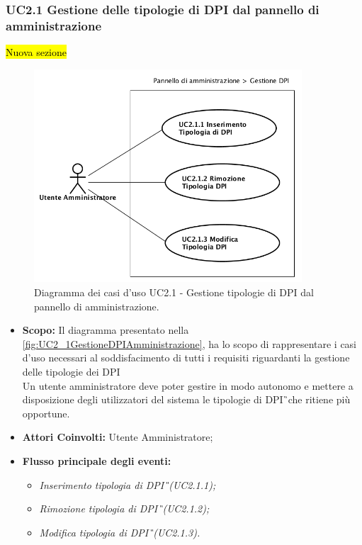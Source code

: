 		\subsubsection{UC2.1 Gestione delle tipologie di DPI dal pannello di amministrazione }
			\label{section:UC2_1}
			\hl{Nuova sezione}
			\begin{figure}[H]
				\begin{center}
					\includegraphics[width=10cm]{Pics/UC2_1GestioneDispositiviDiProtezioneIndividualeDaPannelloDiAmministrazione.png}
					\caption{
						Diagramma dei casi d'uso UC2.1 - Gestione tipologie di DPI dal pannello di amministrazione.}
					\label{fig:UC2_1GestioneDPIAmministrazione}
				\end{center}
			\end{figure}
			\begin{itemize}
				\item \textbf{Scopo:} Il diagramma presentato nella \autoref{fig:UC2_1GestioneDPIAmministrazione}, ha lo scopo di rappresentare i casi d'uso necessari al soddisfacimento di tutti i requisiti riguardanti la gestione delle tipologie dei \gls{DPI}\G\. \\ Un utente amministratore deve poter gestire in modo autonomo e mettere a disposizione degli utilizzatori del sistema le tipologie di \gls{DPI}\G\ che ritiene più opportune.
				\item \textbf{Attori Coinvolti:} Utente Amministratore;
				\item \textbf{Flusso principale degli eventi:} 
				\begin{itemize}
					\item \textit{Inserimento tipologia di \gls{DPI}\G\ (UC2.1.1);}
					\item \textit{Rimozione tipologia di \gls{DPI}\G\ (UC2.1.2);}
					\item \textit{Modifica tipologia di \gls{DPI}\G\ (UC2.1.3).}
				\end{itemize}
			\end{itemize}
		
